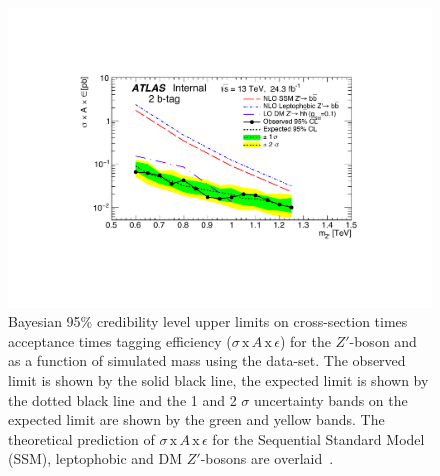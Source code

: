 \begin{figure}[!ht]
  \centering
  \includegraphics[width=0.8\linewidth, angle=0]{figs/Dibjet/LowMass/lim-zprime.pdf}
  \caption[Bayesian 95\% credibility level upper limits on
           cross-section times acceptance times tagging efficiency
           ($\sigma\,\text{x}\,\mathit{A}\,\text{x}\,\epsilon$)
           for the $Z'$-boson and as a function of simulated mass using the \lm{} data-set.
           The observed limit is shown by the solid black line, the expected limit is shown by the dotted black line
           and the 1 and 2 $\sigma$ uncertainty bands on the expected limit are shown by the green and yellow bands.
           The theoretical prediction of $\sigma\,\text{x}\,\mathit{A}\,\text{x}\,\epsilon$
           for the Sequential Standard Model (SSM), leptophobic and DM $Z'$-bosons are overlaid.]
          {Bayesian 95\% credibility level upper limits on cross-section times acceptance times tagging efficiency
            ($\sigma\,\text{x}\,\mathit{A}\,\text{x}\,\epsilon$)
             for the $Z'$-boson and as a function of simulated mass using the \lm{} data-set.
             The observed limit is shown by the solid black line, the expected limit is shown by the dotted black line
             and the 1 and 2 $\sigma$ uncertainty bands on the expected limit are shown by the green and yellow bands.
             The theoretical prediction of $\sigma\,\text{x}\,\mathit{A}\,\text{x}\,\epsilon$
             for the Sequential Standard Model (SSM), leptophobic and DM $Z'$-bosons are overlaid~\cite{dibjet-full_int}.}
  \label{fig:lim-lowmass_benchmark}
\end{figure}


